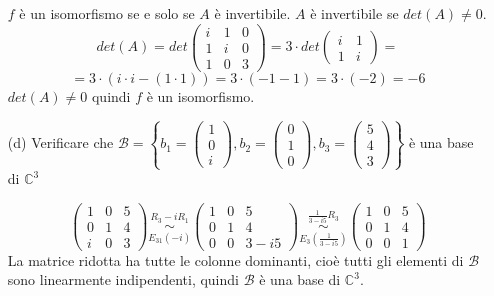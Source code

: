 \documentclass[a4paper]{article}
\theoremstyle{break}
\theoremstyle{break}
\theoremstyle{break}
\theoremstyle{break}
\begin{document}
\begin{enumerate}
	      \vspace{1em}
	      \noindent \( f \) è un isomorfismo se e solo se \( A \) è invertibile. \( A \) è
	      invertibile se \( det(A) \neq 0 \).
	      \[
		      det(A) = det \begin{pmatrix}
			      i & 1 & 0 \\
			      1 & i & 0 \\
			      1 & 0 & 3
		      \end{pmatrix}
		      = 3 \cdot det \begin{pmatrix}
			      i & 1 \\
			      1 & i
		      \end{pmatrix}
		      =
	      \]
	      \[
		      = 3 \cdot (i \cdot i - (1 \cdot 1)) = 3 \cdot (-1 -1) = 3 \cdot (-2) = -6
	      \]
	      \( det(A) \neq 0 \) quindi \( f \) è un isomorfismo.
	\item[(d)] Verificare che \( \mathcal{B} = \left\{
	      b_1 = \begin{pmatrix}
		      1 \\
		      0 \\
		      i
	      \end{pmatrix} ,
	      b_2 = \begin{pmatrix}
		      0 \\
		      1 \\
		      0
	      \end{pmatrix} ,
	      b_3 = \begin{pmatrix}
		      5 \\
		      4 \\
		      3
	      \end{pmatrix}
	      \right\}  \)
	      è una base di \( \mathbb{C}^3 \)

	      \vspace{1em}
	      \[
		      \begin{pmatrix}
			      1 & 0 & 5 \\
			      0 & 1 & 4 \\
			      i & 0 & 3
		      \end{pmatrix}
		      \underset{E_{31}(-i)}{\stackrel{R_3 - iR_1}{\sim}}
		      \begin{pmatrix}
			      1 & 0 & 5      \\
			      0 & 1 & 4      \\
			      0 & 0 & 3 - i5
		      \end{pmatrix}
		      \underset{E_{3}(\frac{1}{3-i5})}{\stackrel{\frac{1}{3-i5}R_3}{\sim}}
		      \begin{pmatrix}
			      1 & 0 & 5 \\
			      0 & 1 & 4 \\
			      0 & 0 & 1
		      \end{pmatrix}
	      \]
	      La matrice ridotta ha tutte le colonne dominanti, cioè tutti gli elementi
	      di \( \mathcal{B} \) sono linearmente indipendenti, quindi \( \mathcal{B} \) è una base di \( \mathbb{C}^3 \).


\end{enumerate}
\end{document}
